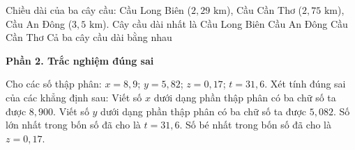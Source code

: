 \begin{ex} %
Chiều dài của ba cây cầu: Cầu Long Biên ($2{,}29\text{ km}$), Cầu Cần Thơ ($2{,}75\text{ km}$), Cầu An Đông ($3{,}5\text{ km}$). Cây cầu dài nhất là
\choice
{Cầu Long Biên}
{\True Cầu An Đông}
{Cầu Cần Thơ}
{Cả ba cây cầu dài bằng nhau}
\end{ex}

\textbf{Phần 2. Trắc nghiệm đúng sai}

\begin{ex} %
Cho các số thập phân: $x = 8{,}9$; $y = 5{,}82$; $z = 0{,}17$; $t = 31{,}6$. Xét tính đúng sai của các khẳng định sau:
\choiceTF
{\True Viết số $x$ dưới dạng phần thập phân có ba chữ số ta được $8{,}900$.}
{Viết số $y$ dưới dạng phần thập phân có ba chữ số ta được $5{,}082$.}
{\True Số lớn nhất trong bốn số đã cho là $t = 31{,}6$.}
{\True Số bé nhất trong bốn số đã cho là $z = 0{,}17$.}
\end{ex}

